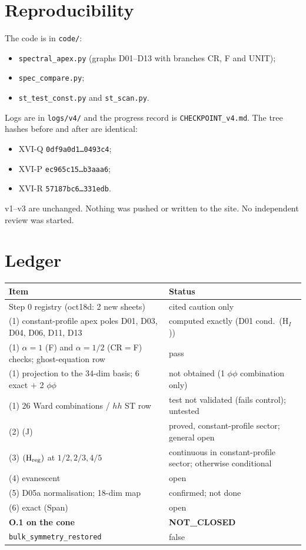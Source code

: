 \documentclass[11pt]{article}
\theoremstyle{definition}
\newcommand{\Hreg}{(\mathrm H_{\rm reg})}
\begin{document}
\section{Reproducibility}
The code is in \texttt{code/}:
\begin{itemize}
\item \texttt{spectral\_apex.py} (graphs D01--D13 with branches CR, F and UNIT);
\item \texttt{spec\_compare.py};
\item \texttt{st\_test\_const.py} and \texttt{st\_scan.py}.
\end{itemize}
Logs are in \texttt{logs/v4/} and the progress record is \texttt{CHECKPOINT\_v4.md}. The tree hashes before and after are identical:
\begin{itemize}
\item XVI-Q \texttt{0df9a0d1\dots0493c4};
\item XVI-P \texttt{ec965c15\dots b3aaa6};
\item XVI-R \texttt{57187bc6\dots331edb}.
\end{itemize}
v1--v3 are unchanged. Nothing was pushed or written to the site. No independent review was started.

\section{Ledger}
\begin{longtable}{p{}p{}}\toprule
Item & Status\\\midrule
Step 0 registry (oct18d: 2 new sheets) & cited caution only\\
(1) constant-profile apex poles D01, D03, D04, D06, D11, D13 & computed exactly (D01 cond.\ (H$_I$))\\
(1) $\alpha=1$ (F) and $\alpha=1/2$ (CR$=$F) checks; ghost-equation row & pass\\
(1) projection to the 34-dim basis; 6 exact $+$ 2 $\phi\phi$ & not obtained (1 $\phi\phi$ combination only)\\
(1) 26 Ward combinations / $hh$ ST row & test not validated (fails control); untested\\
(2) (J) & proved, constant-profile sector; general open\\
(3) $\Hreg$ at $1/2,2/3,4/5$ & continuous in constant-profile sector; otherwise conditional\\
(4) evanescent & open\\
(5) D05a normalisation; 18-dim map & confirmed; not done\\
(6) exact (Span) & open\\\midrule
\textbf{O.1 on the cone} & \textbf{NOT\_CLOSED}\\
\texttt{bulk\_symmetry\_restored} & false\\\bottomrule
\end{longtable}
\end{document}
